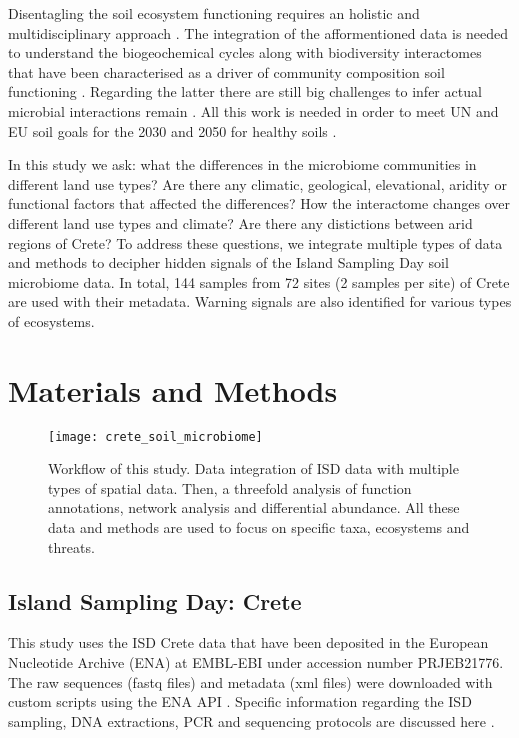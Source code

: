 \documentclass[unnumsec,webpdf,contemporary,large]{oup-authoring-template}%
\theoremstyle{thmstyleone}%
\theoremstyle{thmstyletwo}%
\theoremstyle{thmstylethree}%
\begin{document}
Disentagling the soil ecosystem functioning requires an holistic and 
multidisciplinary approach \cite{vogel2022}. The integration of the afformentioned
data is needed to understand the biogeochemical cycles along with biodiversity interactomes 
that have been characterised as a driver of community composition soil
functioning \cite{GUSEVA2022108604}.
Regarding the latter there are still big challenges to infer actual microbial
interactions remain \cite{Faust2021}. All this work is needed in order to meet
UN and EU soil goals for the 2030 and 2050 for healthy soils \cite{LAL2021e00398}.

In this study we ask: what the differences in the microbiome communities in different land use types?
Are there any climatic, geological, elevational, aridity or functional factors that affected the differences?
How the interactome changes over different land use types and climate?
Are there any distictions between arid regions of Crete?
To address these questions, we integrate multiple types of data and methods to decipher hidden 
signals of the Island Sampling Day soil microbiome data. In total, 144 samples from
72 sites (2 samples per site) of Crete are used with their metadata.
Warning signals are also identified for various types of ecosystems.


\section{Materials and Methods}\label{methods}

\begin{figure}[t] 
    \centering\texttt{[image: crete\_soil\_microbiome]}
    \caption{Workflow of this study. Data integration of ISD data with multiple types of spatial data. Then, a threefold analysis of function annotations, network analysis and differential abundance. All these data and methods are used to focus on specific taxa, ecosystems and threats.}
    \label{fig:workflow}
\end{figure}

\subsection{Island Sampling Day: Crete}\label{isd_data}

This study uses the ISD Crete data that have been deposited
in the European Nucleotide Archive (ENA) at EMBL-EBI under accession number PRJEB21776.
The raw sequences (fastq files) and metadata (xml files) were downloaded with custom scripts using the ENA API \cite{Yuan2023}.
Specific information regarding the ISD sampling, DNA extractions, PCR and sequencing
protocols are discussed here \cite{holm2024}.
\end{document}
